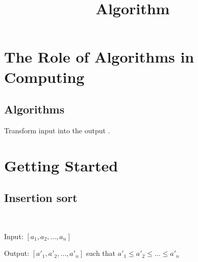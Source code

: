 \documentclass{blog}
\title{Algorithm}
\begin{document}
\maketitle
\tableofcontents
\section{The Role of Algorithms in Computing}
\subsection{Algorithms}
\begin{definition}[algorithm]
    Transform input into the output \cite{CORMEN_1990_INTRODUCTION_TO_ALGORITHMS}.
\end{definition}

\section{Getting Started}
\subsection{Insertion sort}
\begin{definition}~

    Input: $\left[a_{1}, a_{2}, \ldots, a_{n}\right]$

    Output: $\left[a'_{1}, a'_{2}, \ldots, a'_{n}\right]$ such that $a'_{1} \leq a'_{2} \leq \ldots \leq a'_{n}$
\end{definition}


\printbibliography
\end{document}
